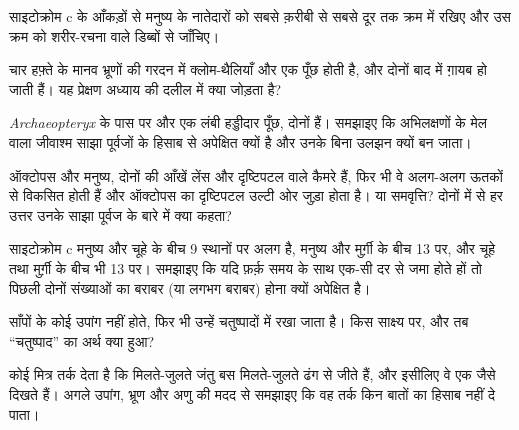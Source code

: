 \begin{exercise}[$\star\star$]\label{exo:g10:common-ancestry:9}
साइटोक्रोम c के आँकड़ों से मनुष्य के नातेदारों को सबसे क़रीबी से सबसे
दूर तक क्रम में रखिए और उस क्रम को शरीर-रचना वाले डिब्बों से जाँचिए।
\end{exercise}

\begin{exercise}[$\star\star$]\label{exo:g10:common-ancestry:10}
चार हफ़्ते के मानव भ्रूणों की गरदन में क्लोम-थैलियाँ और एक पूँछ होती है,
और दोनों बाद में ग़ायब हो जाती हैं। यह प्रेक्षण अध्याय की दलील में क्या
जोड़ता है?
\end{exercise}

\begin{exercise}[$\star\star$]\label{exo:g10:common-ancestry:11}
\emph{Archaeopteryx} के पास पर और एक लंबी हड्डीदार पूँछ, दोनों हैं।
समझाइए कि अभिलक्षणों के मेल वाला जीवाश्म साझा पूर्वजों के हिसाब से
अपेक्षित क्यों है और उनके बिना उलझन क्यों बन जाता।
\end{exercise}

\begin{exercise}[$\star\star\star$]\label{exo:g10:common-ancestry:12}
ऑक्टोपस और मनुष्य, दोनों की आँखें लेंस और दृष्टिपटल वाले कैमरे हैं, फिर
भी वे अलग-अलग ऊतकों से विकसित होती हैं और ऑक्टोपस का दृष्टिपटल उल्टी ओर
जुड़ा होता है।  या समवृत्ति? दोनों में से हर उत्तर उनके साझा पूर्वज
के बारे में क्या कहता?
\end{exercise}

\begin{exercise}[$\star\star\star$]\label{exo:g10:common-ancestry:13}
साइटोक्रोम c मनुष्य और चूहे के बीच 9 स्थानों पर अलग है, मनुष्य और
मुर्ग़ी के बीच 13 पर, और चूहे तथा मुर्ग़ी के बीच भी 13 पर। समझाइए कि
यदि फ़र्क़ समय के साथ एक-सी दर से जमा होते हों तो पिछली दोनों संख्याओं का
बराबर (या लगभग बराबर) होना क्यों अपेक्षित है।
\end{exercise}

\begin{exercise}[$\star\star\star$]\label{exo:g10:common-ancestry:14}
साँपों के कोई उपांग नहीं होते, फिर भी उन्हें चतुष्पादों में रखा जाता है।
किस साक्ष्य पर, और तब ``चतुष्पाद'' का अर्थ क्या हुआ?
\end{exercise}

\begin{exercise}[$\star\star\star$]\label{exo:g10:common-ancestry:15}
कोई मित्र तर्क देता है कि मिलते-जुलते जंतु बस मिलते-जुलते ढंग से जीते
हैं, और इसीलिए वे एक जैसे दिखते हैं। अगले उपांग, भ्रूण और अणु की मदद से
समझाइए कि वह तर्क किन बातों का हिसाब नहीं दे पाता।
\end{exercise}

